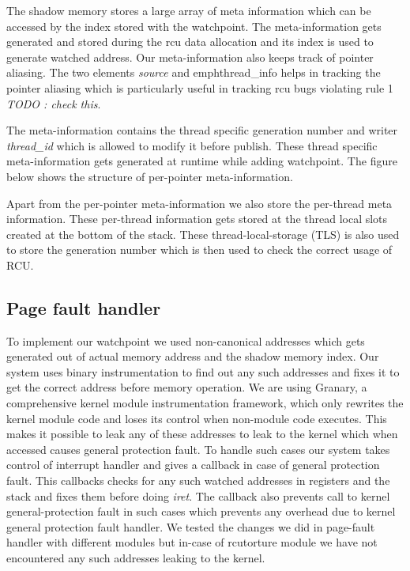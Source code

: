 The shadow memory stores a large array of meta information which can be accessed by the index stored with the watchpoint. The meta-information gets generated and stored during the rcu data allocation and its index is used to generate watched address. Our meta-information also keeps track of pointer aliasing. The two elements \emph{source} and emph{thread\_info} helps in tracking the pointer aliasing which is particularly useful in tracking rcu bugs violating rule 1 \emph{TODO : check this}. 

The meta-information contains the thread specific generation number and writer \emph{thread\_id} which is allowed to modify it before publish. These thread specific meta-information gets generated at runtime while adding watchpoint. The figure below shows the structure of per-pointer meta-information. 

Apart from the per-pointer meta-information we also store the per-thread meta information. These per-thread information gets stored at the thread local slots created at the bottom of the stack. These thread-local-storage (TLS) is also used to store the generation number which is then used to check the correct usage of RCU.

\subsection{Page fault handler}
To implement our watchpoint we used non-canonical addresses which gets generated out of actual memory address and the shadow memory index. Our system uses binary instrumentation to find out any such addresses and fixes it to get the correct address before memory operation. We are using Granary, a comprehensive kernel module instrumentation framework, which only rewrites the kernel module code and loses its control when non-module code executes. This makes it possible to leak any of these addresses to leak to the kernel which when accessed causes general protection fault. To handle such cases our system takes control of interrupt handler and gives a callback in case of general protection fault. This callbacks checks for any such watched addresses in registers and the stack and fixes them before doing \emph{iret}. The callback also prevents call to kernel general-protection fault in such cases which prevents any overhead due to kernel general protection fault handler. We tested the changes we did in page-fault handler with different modules but in-case of rcutorture module we have not encountered any such addresses leaking to the kernel.

